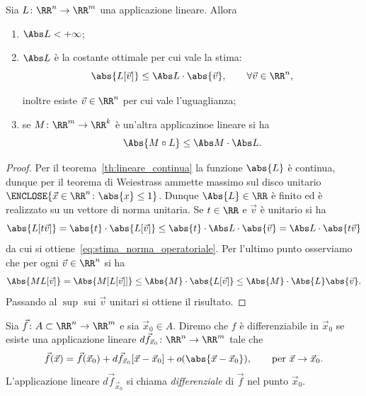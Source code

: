 \begin{theorem}
Sia $L\colon \RR^n \to \RR^m$ una applicazione lineare. 
Allora 
\begin{enumerate}
\item $\Abs L < +\infty$;
\item $\Abs L$ è la costante ottimale per cui vale 
la stima:
\begin{equation}
  \label{eq:stima_norma_operatoriale}  
  \abs{L[\vec v]} \le \Abs L \cdot \abs {\vec v},
  \qquad \forall \vec v \in \RR^n,
\end{equation}

inoltre esiste $\vec v\in\RR^n$ per cui vale 
l'uguaglianza;
\item se $M\colon \RR^m \to \RR^k$ è un'altra applicazinoe 
lineare si ha 
\[
  \Abs{M\circ L} \le \Abs M \cdot \Abs L.
\]
\end{enumerate}
\end{theorem}
%
\begin{proof}
Per il teorema~\ref{th:lineare_continua} la funzione $\abs{L}$ è continua,
dunque per il teorema di Weiestrass ammette massimo sul disco
unitario $\ENCLOSE{\vec x \in \RR^n\colon \abs{x}\le 1}$.
Dunque $\Abs{L}\in \RR$ è finito ed è realizzato 
su un vettore di norma unitaria.
Se $t\in \RR$ e $\vec v$ è unitario si ha
\[
  \abs{L[t\vec v]} = \abs{t}\cdot \abs{L[\vec v]}
  \le \abs{t}\cdot \Abs L \cdot \abs{\vec v} 
  = \Abs L \cdot \abs{t\vec v}
\]
da cui si ottiene~\ref{eq:stima_norma_operatoriale}.
Per l'ultimo punto osserviamo che per ogni $\vec v\in \RR^n$ si ha 
\[
  \Abs{ML[\vec v]} = \Abs{M[L[\vec v]]}
  \le \Abs{M}\cdot \abs{L[\vec v]}
  \le \Abs{M}\cdot \Abs{L}\abs{\vec v}.
\]
Passando al $\sup$ sui $\vec v$ unitari si ottiene il risultato.
\end{proof}

\begin{definition}[differenziabilità]
  Sia $\vec f\colon A \subset \RR^n \to \RR^m$ e sia $\vec x_0\in A$.
  Diremo che $f$ è differenziabile in $\vec x_0$ se esiste 
  una applicazione lineare $d \vec f_{\vec x_0}\colon \RR^n \to \RR^m$ tale che 
  \begin{equation}\label{eq:def_differenziale}
    \vec f(\vec x) = \vec f(\vec x_0) + d\vec f_{\vec x_0}[\vec x- \vec x_0] + o(\abs{\vec x - \vec x_0}), 
    \qquad \text{per } \vec x\to \vec x_0.
  \end{equation}
  L'applicazione lineare $d \vec f_{\vec x_0}$ si 
  chiama \emph{differenziale} di $\vec f$ nel punto $\vec x_0$.
\end{definition}

